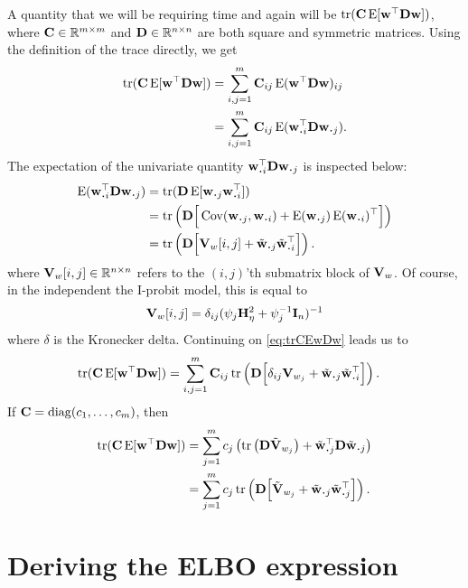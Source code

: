 A quantity that we will be requiring time and again will be $\operatorname{tr}({\mathbf C}\operatorname{E}[{\mathbf w}^\top{\mathbf D}{\mathbf w} ])$, where ${\mathbf C} \in \mathbb{R}^{m \times m}$ and ${\mathbf D} \in \mathbb{R}^{n \times n}$ are both square and symmetric matrices.
Using the definition of the trace directly, we get
\begin{align}
  \tr(\bC\E[\bw^\top\bD\bw ])
  &= \sum_{i,j=1}^m \bC_{ij} \E(\bw^\top\bD\bw )_{ij} \nonumber \\
  &= \sum_{i,j=1}^m \bC_{ij} \E(\bw_{\bigcdot i}^\top\bD\bw_{\bigcdot j} ). \label{eq:trCEwDw}
\end{align}
The expectation of the univariate quantity $\bw_{\bigcdot i}^\top\bD\bw_{\bigcdot j}$ is inspected below:
\begin{align*}
  \E(\bw_{\bigcdot i}^\top\bD\bw_{\bigcdot j})
  &= \tr(\bD \E[\bw_{\bigcdot j}\bw_{\bigcdot i}^\top]) \\
  &= \tr \left(\bD \Big[\Cov(\bw_{\bigcdot j},\bw_{\bigcdot i}) + \E(\bw_{\bigcdot j}) \E(\bw_{\bigcdot i})^\top \Big] \right) \\
  &= \tr\left( \bD \Big[ \bV_w[i,j]  + \tilde\bw_{\bigcdot j}\tilde\bw_{\bigcdot i}^\top \Big] \right).
\end{align*}
where ${\mathbf V}_w[i,j] \in \mathbb{R}^{n\times n}$ refers to the $(i,j)$'th submatrix block of ${\mathbf V}_w$.
Of course, in the independent the I-probit model, this is equal to 
\[
  {\mathbf V}_w[i,j] = \delta_{ij}(\psi_j{\mathbf H}_\eta^2 + \psi_j^{-1}{\mathbf I}_n)^{-1}
\]
where $\delta$ is the Kronecker delta. 
Continuing on \cref{eq:trCEwDw} leads us to
\begin{align*}
  \tr(\bC\E[\bw^\top\bD\bw ])
  &= \sum_{i,j=1}^m \bC_{ij} 
  \tr \left(\bD \Big[ \delta_{ij}\bV_{w_j}  + \tilde\bw_{\bigcdot j}\tilde\bw_{\bigcdot i}^\top \Big] \right).
\end{align*}
If ${\mathbf C} = \operatorname{diag}(c_1,\dots,c_m)$, then
\begin{align*}
  \tr(\bC\E[\bw^\top\bD\bw ]) 
  &= \sum_{j=1}^m c_j\left( 
  \tr \big( \bD \tilde\bV_{w_j} \big)  +
  \tilde\bw_{\bigcdot j}^\top \bD \tilde\bw_{\bigcdot j}
  \right) \\
  &= \sum_{j=1}^m c_j
  \tr \left( \bD \Big[ \tilde\bV_{w_j} + \tilde\bw_{\bigcdot j} \tilde\bw_{\bigcdot j}^\top \Big] \right).
\end{align*}

\section{Deriving the ELBO expression}

